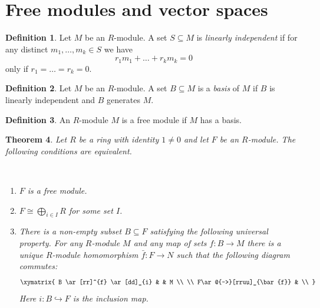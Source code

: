 \documentclass[12pt, letterpaper, oneside]{article}
\theoremstyle{plain}
\newtheorem{theorem}{Theorem}[section]
\theoremstyle{definition}
\newtheorem{definition}[theorem]{Definition}
\newcommand{\hra}{\hookrightarrow}
\newcommand{\benu}{\begin{enumerate}}
\newcommand{\eenu}{\end{enumerate}}
\newcommand{\vs}{\vskip 5mm}
\begin{document}
 




\newpage
\section{Free modules and vector spaces}
\label{SEC_FREEMODS} 
 
 \begin{definition}
 Let $M$ be an $R$-module. A set $S\subseteq M$ is \emph{linearly independent}
 if for any distinct $m_{1}, \dots, m_{k}\in S$ we have 
 $$r_{1}m_{1}+ {\dots} + r_{k}m_{k} = 0$$
 only if $r_{1}={\dots} = r_{k} = 0$. 
 \end{definition}
 
 
 \vs\vs
 
 
 \begin{definition}
 Let $M$ be an $R$-module. A set $B\subseteq M$ is a \emph{basis} of $M$ if $B$
 is linearly independent and $B$ generates $M$.
 \end{definition}
 
 
 \vs\vs
 
 
 \begin{definition}
 An $R$-module $M$ is a free module if $M$ has a basis. 
 \end{definition}
 
 
 \vs\vs
 
 \begin{theorem}
 Let $R$ be a ring with identity $1\neq 0$ and let $F$ be an $R$-module. 
 The following conditions are equivalent. 
 
 \vskip -13mm
 
 \ 
 \benu
 \item $F$ is a free module.
 \item $F\cong \bigoplus_{i\in I} R$ for some set $I$.
 \item There is a non-empty subset $B\subseteq F$ satisfying the following universal property. 
 For any $R$-module $M$ and  any map of sets $f\colon B \to M$ there is a unique $R$-module 
 homomorphism $\bar{f}\colon F \to N$ such that the following diagram commutes:
 $$
\xymatrix{
B \ar[rr]^{f} \ar[dd]_{i} & & M \\
\\
F\ar@{-->}[rruu]_{\bar{f}} & \\
}
$$
 Here $i\colon B \hra F$ is the inclusion map.
 \eenu

 
 \end{theorem}
 
\end{document}
